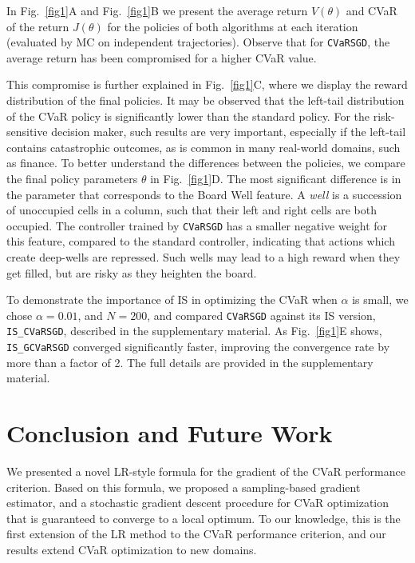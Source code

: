 \documentclass[letterpaper]{article}
\begin{document}
In Fig.~\ref{fig1}A and Fig.~\ref{fig1}B we present the average return $V(\theta)$ and CVaR of the return $J(\theta)$ for the policies of both algorithms at each iteration (evaluated by MC on independent trajectories). Observe that for \texttt{CVaRSGD}, the average return has been compromised for a higher CVaR value.

This compromise is further explained in Fig.~\ref{fig1}C, where we display the reward distribution of the final policies.
It may be observed that the left-tail distribution of the CVaR policy is significantly lower than the standard policy. For the risk-sensitive decision maker, such results are very important, especially if the left-tail contains catastrophic outcomes, as is common in many real-world domains, such as finance.
To better understand the differences between the policies, we compare the final policy parameters $\theta$ in Fig.~\ref{fig1}D. The most significant difference is in the parameter that corresponds to the Board Well feature. A \textit{well} is a succession of unoccupied cells in a column, such that their left and right cells are both occupied. The controller trained by \texttt{CVaRSGD} has a smaller negative weight for this feature, compared to the standard controller, indicating that actions which create deep-wells are repressed. Such wells may lead to a high reward when they get filled, but are risky as they heighten the board.

To demonstrate the importance of IS in optimizing the CVaR when $\alpha$ is small, we chose $\alpha=0.01$, and $N = 200$, and compared \texttt{CVaRSGD} against its IS version, \texttt{IS\_CVaRSGD}, described in the supplementary material.
As Fig.~\ref{fig1}E shows, \texttt{IS\_GCVaRSGD} converged significantly faster, improving the convergence rate by more than a factor of 2. The full details are provided in the supplementary material.



\section{Conclusion and Future Work}
We presented a novel LR-style formula for the gradient of the CVaR performance criterion. Based on this formula, we proposed a sampling-based gradient estimator, and a stochastic gradient descent procedure for CVaR optimization that is guaranteed to converge to a local optimum. To our knowledge, this is the first extension of the LR method to the CVaR performance criterion, and our results extend CVaR optimization to new domains.
\end{document}
